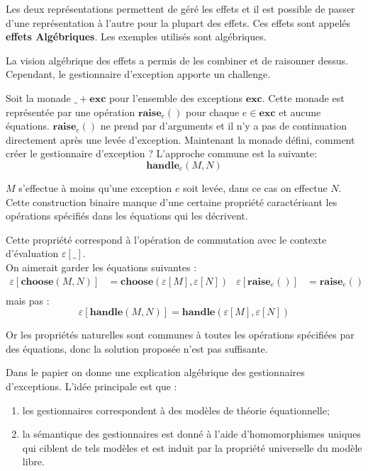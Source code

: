 	Les deux représentations permettent de géré les effets et il est possible de passer d'une représentation à l'autre pour la plupart des effets. Ces effets sont appelés \textbf{effets Algébriques}. Les exemples utilisés sont algébriques.
	\medbreak
	
	La vision algébrique des effets a permis de les combiner et de raisonner dessus. Cependant, le gestionnaire d'exception apporte un challenge.
	\smallbreak
	
	Soit la monade $\_ + \textbf{exc}$ pour l'ensemble des exceptions $\textbf{exc}$. Cette monade est représentée par une opération $\textbf{raise}_e()$ pour chaque $e \in \textbf{exc}$ et aucune équations. $\textbf{raise}_e()$ ne prend par d'arguments et il n'y a pas de continuation directement après une levée d'exception. Maintenant la monade défini, comment créer le gestionnaire d'exception ? L'approche commune est la suivante:
	\[\textbf{handle}_e(M,N)\]
		
	$M$ s'effectue à moins qu'une exception $e$ soit levée, dans ce cas on effectue $N$. Cette construction binaire manque d'une certaine propriété caractérisant les opérations spécifiés dans les équations qui les décrivent.
	
	\begin{exemple}
		Cette propriété correspond à l'opération de commutation avec le contexte d'évaluation $\varepsilon[\_]$.\\
		On aimerait garder les équations suivantes : 
		\begin{align*}
			\varepsilon[\textbf{choose}(M,N)] &= \textbf{choose}(\varepsilon[M],\varepsilon[N]) & \varepsilon[\textbf{raise}_e()] &= \textbf{raise}_e()\\
		\end{align*}
		mais pas : 
		\[\varepsilon[\textbf{handle}(M,N)] = \textbf{handle}(\varepsilon[M],\varepsilon[N])\]
	
		Or les propriétés naturelles sont communes à toutes les opérations spécifiées par des équations, donc la solution proposée n'est pas suffisante.
	\end{exemple} 

	Dans le papier on donne une explication algébrique des gestionnaires d'exceptions. L'idée principale est que :
	\begin{enumerate}
		\item les gestionnaires correspondent à des modèles de théorie équationnelle;
		\item la sémantique des gestionnaires est donné à l'aide d'homomorphismes uniques qui ciblent de tels modèles et est induit par la propriété universelle du modèle libre. 
	\end{enumerate}

